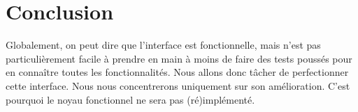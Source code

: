\documentclass[12pt, a4paper]{article}
\begin{document}
\section{Conclusion}
Globalement, on peut dire que l'interface est fonctionnelle, mais n'est pas particulièrement facile à prendre en main à moins de faire 
des tests poussés pour en connaître toutes les fonctionnalités. Nous allons donc tâcher de perfectionner cette interface. 
Nous nous concentrerons uniquement sur son amélioration. C'est pourquoi le noyau fonctionnel ne sera pas (ré)implémenté.
\end{document}
